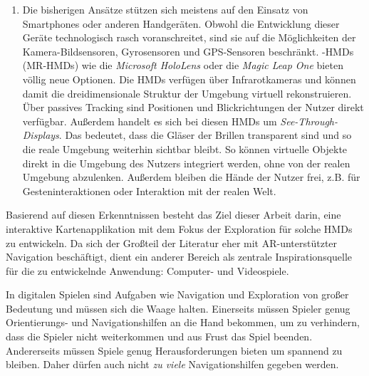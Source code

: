 \begin{enumerate}
\item Die bisherigen Ansätze stützen sich meistens auf den Einsatz von Smartphones oder anderen Handgeräten.
Obwohl die Entwicklung dieser Geräte technologisch rasch voranschreitet, sind sie auf die Möglichkeiten der Kamera-Bildsensoren, Gyrosensoren und \gls{GPS}-Sensoren beschränkt.
\emph{}-\glspl{HMD} (\gls{MR}-\glspl{HMD}) wie die \emph{Microsoft HoloLens} \parencite{Microsoft2018} oder die \emph{Magic Leap One} \parencite{MagicLeap2018} bieten völlig neue Optionen.
Die \glspl{HMD} verfügen über Infrarotkameras und können damit die dreidimensionale Struktur der Umgebung virtuell rekonstruieren.
Über passives Tracking sind Positionen und Blickrichtungen der Nutzer direkt verfügbar.
Außerdem handelt es sich bei diesen \glspl{HMD} um \emph{See-Through-Displays}.
Das bedeutet, dass die Gläser der Brillen transparent sind und so die reale Umgebung weiterhin sichtbar bleibt.
So können virtuelle Objekte direkt in die Umgebung des Nutzers integriert werden, ohne von der realen Umgebung abzulenken.
Außerdem bleiben die Hände der Nutzer frei, z.B. für Gesteninteraktionen oder Interaktion mit der realen Welt.
\end{enumerate}

Basierend auf diesen Erkenntnissen besteht das Ziel dieser Arbeit darin, eine interaktive Kartenapplikation mit dem Fokus der Exploration für solche \glspl{HMD} zu entwickeln.
Da sich der Großteil der Literatur eher mit \gls{AR}-unterstützter Navigation beschäftigt, dient ein anderer Bereich als zentrale Inspirationsquelle für die zu entwickelnde Anwendung: Computer- und Videospiele.

In digitalen Spielen sind Aufgaben wie Navigation und Exploration von großer Bedeutung und müssen sich die Waage halten.
Einerseits müssen Spieler genug Orien\-tie\-rungs- und Navigationshilfen an die Hand bekommen, um zu verhindern, dass die Spieler nicht weiterkommen und aus Frust das Spiel beenden.
Andererseits müssen Spiele genug Herausforderungen bieten um spannend zu bleiben.
Daher dürfen auch nicht \emph{zu viele} Navigationshilfen gegeben werden.

